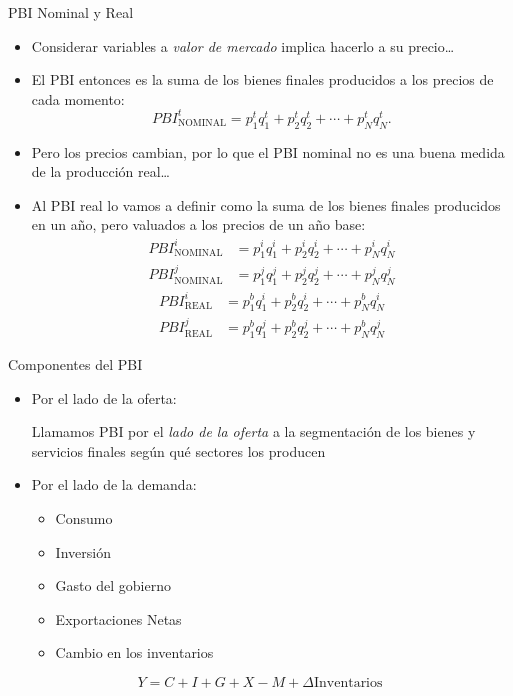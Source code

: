 \documentclass{beamer}
\begin{document}
\begin{frame}{PBI Nominal y Real}
    \begin{itemize}
        \item Considerar variables a \textit{valor de mercado} implica hacerlo a su precio\dots
        \item El PBI entonces es la suma de los bienes finales producidos a los precios de cada momento:
        \begin{equation*}
            PBI_{\text{NOMINAL}}^t = p_1^t q_1^t + p_2^t q_2^t + \cdots + p_N^t q_N^t.
        \end{equation*}
        \item Pero los precios cambian, por lo que el PBI nominal no es una buena medida de la producción real\dots
        \item Al PBI real lo vamos a definir como la suma de los bienes finales producidos en un año, pero valuados a los precios de un año base:
        \begin{align*}
            PBI_{\text{NOMINAL}}^i &= p_1^i q_1^i + p_2^i q_2^i + \cdots + p_N^i q_N^i \\
            PBI_{\text{NOMINAL}}^j &= p_1^j q_1^j + p_2^j q_2^j + \cdots + p_N^j q_N^j
        \end{align*}
        \begin{align*}
            PBI_{\text{REAL}}^i &= p_1^b q_1^i + p_2^b q_2^i + \cdots + p_N^b q_N^i \\
            PBI_{\text{REAL}}^j &= p_1^b q_1^j + p_2^b q_2^j + \cdots + p_N^b q_N^j
        \end{align*}
    \end{itemize}
\end{frame}

\begin{frame}{Componentes del PBI}
    \begin{itemize}
        \item Por el lado de la oferta:
        \begin{boxA}
            Llamamos PBI por el \textit{lado de la oferta} a la segmentación de
            los bienes y servicios finales según qué sectores los producen
        \end{boxA}
        \item Por el lado de la demanda:
        \begin{itemize}
            \item Consumo
            \item Inversión
            \item Gasto del gobierno
            \item Exportaciones Netas
            \item Cambio en los inventarios
        \end{itemize}
    \end{itemize}
    \begin{equation*}
        Y = C + I + G + X - M + \Delta \text{Inventarios}
    \end{equation*}
\end{frame}
\end{document}
